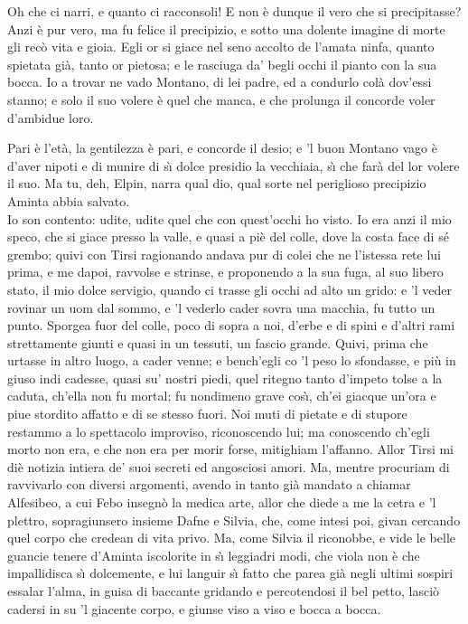 \documentclass{book}
\begin{document}
	\9 Oh che ci narri, e quanto
	ci racconsoli! E non \`e dunque il vero
	che si precipitasse? \\

   \8 Anzi \`e pur vero,
	ma fu felice il precipizio, e sotto
	una dolente imagine di morte
	gli rec\`o vita e gioia. Egli or si giace
	nel seno accolto de l'amata ninfa,
	quanto spietata gi\`a, tanto or pietosa;
	e le rasciuga da' begli occhi il pianto
	con la sua bocca. Io a trovar ne vado
	Montano, di lei padre, ed a condurlo
	col\`a dov'essi stanno; e solo il suo
	volere \`e quel che manca, e che prolunga
	il concorde voler d'ambidue loro.

	\9 Pari \`e l'et\`a, la gentilezza \`e pari,
	e concorde il desio; e 'l buon Montano
	vago \`e d'aver nipoti e di munire
	di s\`{\i} dolce presidio la vecchiaia,
	s\`{\i} che far\`a del lor volere il suo.
	Ma tu, deh, Elpin, narra qual dio, qual sorte
	nel periglioso precipizio Aminta
	abbia salvato. \\

   \8 Io son contento: udite,
	udite quel che con quest'occhi ho visto.
	Io era anzi il mio speco, che si giace
	presso la valle, e quasi a pi\`e del colle,
	dove la costa face di s\'e grembo;
	quivi con Tirsi ragionando andava
	pur di colei che ne l'istessa rete
	lui prima, e me dapoi, ravvolse e strinse,
	e proponendo a la sua fuga, al suo
	libero stato, il mio dolce servigio,
	quando ci trasse gli occhi ad alto un grido:
	e 'l veder rovinar un uom dal sommo,
	e 'l vederlo cader sovra una macchia,
	fu tutto un punto. Sporgea fuor del colle,
	poco di sopra a noi, d'erbe e di spini
	e d'altri rami strettamente giunti
	e quasi in un tessuti, un fascio grande.
	Quivi, prima che urtasse in altro luogo,
	a cader venne; e bench'egli co 'l peso
	lo sfondasse, e pi\`u in giuso indi cadesse,
	quasi su' nostri piedi, quel ritegno
	tanto d'impeto tolse a la caduta,
	ch'ella non fu mortal; fu nondimeno
	grave cos\`{\i}, ch'ei giacque un'ora e piue
	stordito affatto e di se stesso fuori.
	Noi muti di pietate e di stupore
	restammo a lo spettacolo improviso,
	riconoscendo lui; ma conoscendo
	ch'egli morto non era, e che non era
	per morir forse, mitighiam l'affanno.
	Allor Tirsi mi di\`e notizia intiera
	de' suoi secreti ed angosciosi amori.
	Ma, mentre procuriam di ravvivarlo
	con diversi argomenti, avendo in tanto
	gi\`a mandato a chiamar Alfesibeo,
	a cui Febo insegn\`o la medica arte,
	allor che diede a me la cetra e 'l plettro,
	sopragiunsero insieme Dafne e Silvia,
	che, come intesi poi, givan cercando
	quel corpo che credean di vita privo.
	Ma, come Silvia il riconobbe, e vide
	le belle guancie tenere d'Aminta
	iscolorite in s\`{\i} leggiadri modi,
	che viola non \`e che impallidisca
	s\`{\i} dolcemente, e lui languir s\`{\i} fatto
	che parea gi\`a negli ultimi sospiri
	essalar l'alma, in guisa di baccante
	gridando e percotendosi il bel petto,
	lasci\`o cadersi in su 'l giacente corpo,
	e giunse viso a viso e bocca a bocca.
\end{document}
